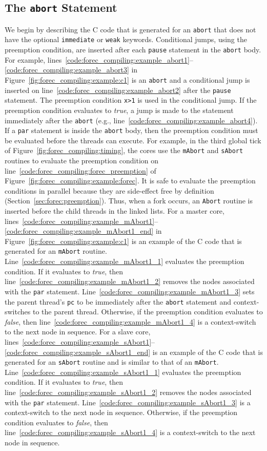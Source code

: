 \subsection{The \texttt{abort} Statement}
We begin by describing the C code that is generated 
for an \verb$abort$ that does not have the optional 
\verb$immediate$ or \verb$weak$ keywords. 
Conditional jumps, using the preemption condition, 
are inserted after each \verb$pause$ statement in the 
\verb$abort$ body. For example, 
lines~\ref{code:forec_compiling:example_abort1}--\ref{code:forec_compiling:example_abort3} 
in Figure~\ref{fig:forec_compiling:example:c1} is an 
\verb$abort$ and a conditional jump is inserted on 
line~\ref{code:forec_compiling:example_abort2} 
after the \verb$pause$ statement.
The preemption condition \verb$x>1$ is used 
in the conditional jump. If the preemption 
condition evaluates to \emph{true}, a jump is
made to the statement immediately after the
\verb$abort$ (e.g., line~\ref{code:forec_compiling:example_abort4}).
If a \verb$par$ statement is inside
the \verb$abort$ body, then the preemption condition must be
evaluated before the threads can execute. For example, 
in the third global tick of Figure~\ref{fig:forec_compiling:timing},
the cores use the \verb$mAbort$ and \verb$sAbort$ routines to evaluate
the preemption condition on 
line~\ref{code:forec_compiling:forec_preemption} of 
Figure~\ref{fig:forec_compiling:example:forec}. It is safe to 
evaluate the preemption conditions in parallel because 
they are side-effect free by definition (Section~\ref{sec:forec:preemption}).
Thus, when a fork occurs, an \verb$Abort$ routine 
is inserted before the child threads in the linked lists. 
For a master core, 
lines~\ref{code:forec_compiling:example_mAbort1}--\ref{code:forec_compiling:example_mAbort1_end} 
in Figure~\ref{fig:forec_compiling:example:c1} 
is an example of the C code that is generated for an 
\verb$mAbort$ routine. 
Line~\ref{code:forec_compiling:example_mAbort1_1} 
evaluates the preemption condition. If it evaluates
to \emph{true}, then line~\ref{code:forec_compiling:example_mAbort1_2}
removes the nodes associated with the \verb$par$ statement.
Line~\ref{code:forec_compiling:example_mAbort1_3} sets the 
parent thread's \verb$pc$ to be immediately after the
\verb$abort$ statement and context-switches to the parent
thread. Otherwise, if the preemption condition evaluates
to \emph{false}, then line~\ref{code:forec_compiling:example_mAbort1_4}
is a context-switch to the next node in sequence.
For a slave core, 
lines~\ref{code:forec_compiling:example_sAbort1}--\ref{code:forec_compiling:example_sAbort1_end} 
is an example of the C code that is generated for an \verb$sAbort$
routine and is similar to that of an \verb$mAbort$.
Line~\ref{code:forec_compiling:example_sAbort1_1}
evaluates the preemption condition. If it evaluates
to \emph{true}, then line~\ref{code:forec_compiling:example_sAbort1_2}
removes the nodes associated with the \verb$par$ statement.
Line~\ref{code:forec_compiling:example_sAbort1_3} is a 
context-switch to the next node in sequence. Otherwise, 
if the preemption condition evaluates
to \emph{false}, then line~\ref{code:forec_compiling:example_sAbort1_4}
is a context-switch to the next node in sequence.

